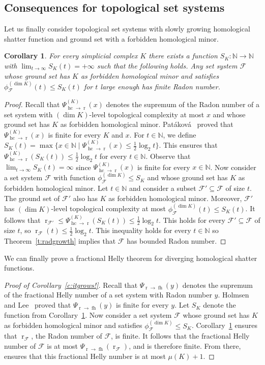 \documentclass[11pt]{article}
\newcommand{\N}{\mathbb{N}}
\newcommand{\F}{\mathcal{F}}
\DeclareMathOperator{\rad}{r}
\DeclareMathOperator{\fh}{fh}
\DeclareMathOperator{\hc}{hc}
\newtheorem{corollary}[theorem]{Corollary}
\begin{document}
\subsection{Consequences for topological set systems}
%
Let us finally consider topological set systems with slowly growing homological shatter function and ground set with a forbidden homological minor.
%
\begin{corollary}\label{c:Patakova+}
  For every simplicial complex $K$ there exists a function $S_K : \N \to \N$ with $\lim_{t \to \infty} S_K(t) = +\infty$ such that the following holds. Any set system $\F$ whose ground set has $K$ as forbidden homological minor and satisfies $\phi_{\F}^{(\dim K)}(t) \le S_K(t)$ for $t$ large enough has finite Radon number.  
\end{corollary}
\begin{proof}
  Recall that $\Psi^{(K)}_{\hc \to \rad}(x)$ denotes the supremum of the Radon number of a set system with $(\dim K)$-level topological complexity at most $x$ and whose ground set has $K$ as forbidden homological minor. Patáková~\cite{patakova2022bounding} proved that $\Psi^{(K)}_{\hc \to \rad}(x)$ is finite for every $K$ and $x$.
%
  \medskip
%
  For $t \in \N$, we define $S_K(t) =\max\{x\in\N\mid \Psi^{(K)}_{\hc \to \rad}(x) \le \frac12 \log_2 t\}$. This ensures that $\Psi^{(K)}_{\hc \to \rad}(S_K(t)) \le \frac12 \log_2 t$ for every $t \in \N$.    Observe that $\lim_{t \to \infty} S_K(t) = \infty$ since $\Psi^{(K)}_{\hc \to \rad}(x)$ is finite for every $x \in \N$.
%
  \medskip
%
  Now consider a set system $\F$ with function $\phi_{\F}^{(\dim K)} \le S_K$ and whose ground set has $K$ as forbidden homological minor. Let $t \in \N$ and consider a subset $\F' \subseteq \F$ of size $t$. The ground set of $\F'$ also has $K$ as forbidden homological minor. Moreover, $\F'$ has  $(\dim K)$-level topological complexity at most $\phi_{\F}^{(\dim K)}(t) \le S_K(t)$. It follows that $\rad_{\F'} \le \Psi^{(K)}_{\hc \to \rad}(S_K(t)) \le \frac12 \log_2 t$. This holds for every $\F' \subseteq \F$ of size $t$, so $\rad_\F(t) \le \frac12 \log_2 t$. This inequality holds for every $t \in \N$ so Theorem~\ref{t:radgrowth} implies that $\F$ has bounded Radon number.
\end{proof}
%
\noindent
We can finally prove a fractional Helly theorem for diverging homological shatter functions.
%
\begin{proof}[Proof of Corollary~\ref{c:itgrows!}]
  Recall that $\Psi_{\rad \to \fh}(y)$ denotes the supremum of the fractional Helly number of a set system with Radon number $y$. Holmsen and Lee~\cite[Theorem~1.1]{Holmsen2021} proved that $\Psi_{\rad \to \fh}(y)$ is finite for every $y$. Let $S_K$ denote the function from Corollary~\ref{c:Patakova+}. Now consider a set system $\F$ whose ground set has $K$ as forbidden homological minor and satisfies $\phi_{\F}^{(\dim K)} \le S_K$. Corollary~\ref{c:Patakova+} ensures that $\rad_\F$, the Radon number of $\F$, is finite. It follows that the fractional Helly number of $\F$ is at most $\Psi_{\rad \to \fh}(\rad_\F)$, and is therefore finite. From there, \cite[Theorem~1.2]{steppingUp} ensures that this fractional Helly number is at most $\mu(K)+1$.
\end{proof}
%
%
%
\end{document}
